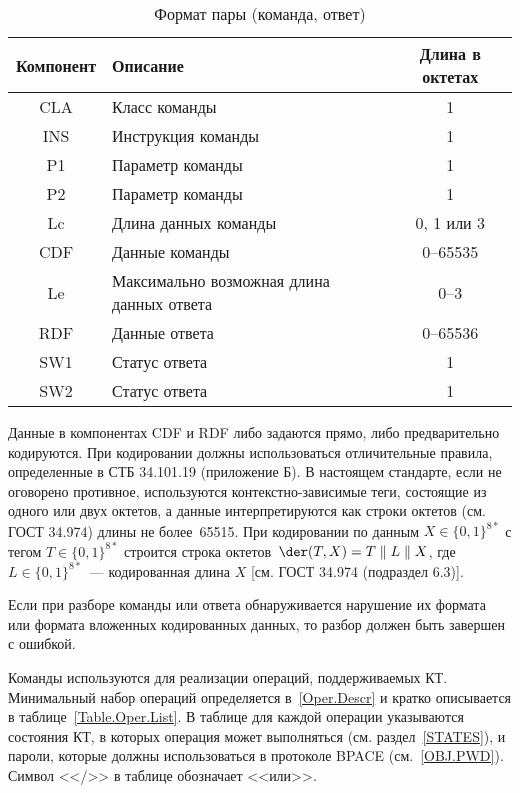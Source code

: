 \begin{table}[h!]
\caption{Формат пары (команда, ответ)}\label{Table.CMDS.Fmt}
\begin{tabular}{|c|p{10.5cm}|c|}
\hline
Компонент & Описание & Длина в октетах \\
\hline
\hline
CLA & Класс команды & 1 \\
\hline
INS & Инструкция команды & 1 \\
\hline
P1 & Параметр команды & 1 \\
\hline
P2 & Параметр команды & 1 \\
\hline
Lc & Длина данных команды & 0, 1 или 3  \\
\hline
CDF & Данные команды & 0--65535 \\
\hline
Le & Максимально возможная длина данных ответа & 0--3 
\\
\hline
RDF & Данные ответа & 0--65536 \\
\hline
SW1 & Статус ответа & 1 \\
\hline
SW2 & Статус ответа & 1 \\
\hline
\end{tabular}
\end{table}

Данные в компонентах CDF и RDF либо задаются прямо, либо предварительно кодируются. 
При кодировании должны использоваться отличительные правила, определенные в СТБ 34.101.19 
(приложение Б). В настоящем стандарте, если не оговорено противное, используются 
контекстно-зависимые теги, состоящие из одного или двух октетов, а данные 
интерпретируются как строки октетов (см. ГОСТ 34.974) длины не более~65515. 
При кодировании по данным $X\in\{0,1\}^{8*}$ с тегом $T\in\{0,1\}^{8*}$ строится 
строка октетов~$\der(T, X) = T \parallel L \parallel X$, 
где $L\in\{0,1\}^{8*}$~--- кодированная длина $X$ [см. ГОСТ 34.974 (подраздел 
6.3)].  

Если при разборе команды или ответа обнаруживается нарушение их 
формата или формата вложенных кодированных данных, то разбор 
должен быть завершен с ошибкой. 

Команды используются для реализации операций, поддерживаемых КТ.
Минимальный набор операций определяется в~\ref{Oper.Descr}
и кратко описывается в таблице~\ref{Table.Oper.List}. 
%
В таблице для каждой операции указываются состояния КТ, 
в которых операция может выполняться (см. раздел~\ref{STATES}),
и пароли, которые должны использоваться в протоколе BPACE (см.~\ref{OBJ.PWD}).  
%
Символ <</>> в таблице обозначает <<или>>.

